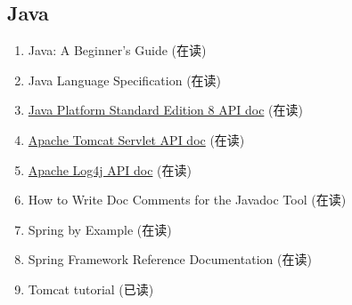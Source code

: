 \documentclass{article}
\begin{document}
\subsection{Java}
\begin{enumerate}
    \item Java: A Beginner's Guide (在读)
    \item Java Language Specification (在读)
    \item \href{http://docs.oracle.com/javase/8/docs/api/index.html?overview-summary.html}{Java Platform Standard Edition 8 API doc} (在读)
    \item \href{http://tomcat.apache.org/tomcat-8.0-doc/servletapi/}{Apache Tomcat Servlet API doc} (在读)
    \item \href{http://logging.apache.org/log4j/2.x/log4j-api/apidocs/index.html}{Apache Log4j API doc} (在读)
    \item How to Write Doc Comments for the Javadoc Tool (在读)
    \item Spring by Example (在读)
    \item Spring Framework Reference Documentation (在读)
    \item Tomcat tutorial (已读)
\end{enumerate}
\end{document}
